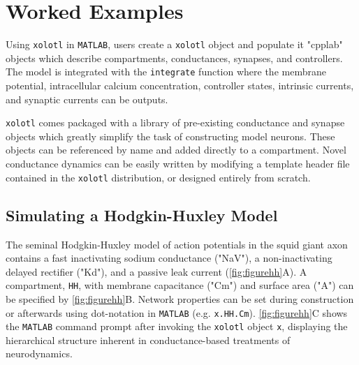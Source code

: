 \documentclass{frontiersSCNS} %
\begin{document}
%
%
%
%
%
%

\section{Worked Examples}
\label{sec:examples}

Using \texttt{xolotl} in \texttt{MATLAB}, users create a \texttt{xolotl} object and populate it "cpplab" objects which describe compartments, conductances, synapses, and controllers. The model is integrated with the \texttt{integrate} function where the membrane potential, intracellular calcium concentration, controller states, intrinsic currents, and synaptic currents can be outputs.

\texttt{xolotl} comes packaged with a library of pre-existing conductance and synapse objects which greatly simplify the task of constructing model neurons. These objects can be referenced by name and added directly to a compartment. Novel conductance dynamics can be easily written by modifying a template header file contained in the \texttt{xolotl} distribution, or designed entirely from scratch.

%
%
%
%
%
%

\subsection{Simulating a Hodgkin-Huxley Model}

The seminal Hodgkin-Huxley model of action potentials in the squid giant axon \autocite{hodgkinComponentsMembraneConductance1952, hodgkinMeasurementCurrentvoltageRelations1952} contains a fast inactivating sodium conductance ("NaV"), a non-inactivating delayed rectifier ("Kd"), and a passive leak current (\ref{fig:figurehh}A). A compartment, \texttt{HH}, with membrane capacitance ("Cm") and surface area ("A") can be specified by \ref{fig:figurehh}B. Network properties can be set during construction or afterwards using dot-notation in \texttt{MATLAB} (e.g. \texttt{x.HH.Cm}). \ref{fig:figurehh}C shows the \texttt{MATLAB} command prompt after invoking the \texttt{xolotl} object \texttt{x}, displaying the hierarchical structure inherent in conductance-based treatments of neurodynamics.
\end{document}

